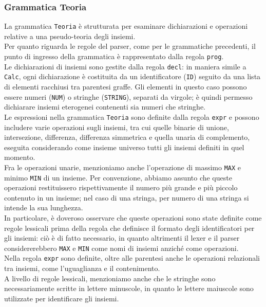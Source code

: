 \documentclass{article}
\begin{document}
\subsubsection{Grammatica Teoria}
La grammatica \texttt{Teoria} è strutturata per esaminare  dichiarazioni e operazioni relative a una pseudo-teoria degli insiemi.
\\\noindent
Per quanto riguarda le regole del parser, come per le grammatiche precedenti, il punto di ingresso della grammatica è rappresentato dalla regola \texttt{prog}.
\\\noindent
Le dichiarazioni di insiemi sono gestite dalla regola \texttt{decl}: in maniera simile a \texttt{Calc}, ogni dichiarazione è costituita da un identificatore (\texttt{ID}) seguito da una lista di elementi racchiusi tra parentesi graffe. Gli elementi in questo caso possono essere numeri (\texttt{NUM}) o stringhe (\texttt{STRING}), separati da virgole; è quindi permesso dichiarare insiemi eterogenei contenenti sia numeri che stringhe.
\\\noindent
Le espressioni nella grammatica \texttt{Teoria} sono definite dalla regola \texttt{expr} e possono includere varie operazioni sugli insiemi, tra cui quelle binarie di unione, intersezione, differenza, 
 differenza simmetrica e quella unaria di complemento, eseguita considerando come insieme universo tutti gli insiemi definiti in quel momento. 
\\\noindent
Fra le operazioni unarie, menzioniamo anche l'operazione di massimo \texttt{MAX} e minimo \texttt{MIN} di un insieme. Per convenzione, abbiamo assunto che queste operazioni restituissero rispettivamente il numero più grande e più piccolo contenuto in un insieme; nel caso di una stringa, per numero di una stringa si intende la sua lunghezza.
\\\noindent
In particolare, è doveroso osservare che queste operazioni sono state definite come regole lessicali prima della regola che definisce il formato degli identificatori per gli insiemi: ciò è di fatto necessario, in quanto altrimenti il lexer e il parser considererebbero \texttt{MAX} e \texttt{MIN} come nomi di insiemi anziché come operazioni.
\\\noindent
Nella regola \texttt{expr} sono definite, oltre alle parentesi anche le operazioni relazionali tra insiemi, come l'uguaglianza e il contenimento.
\\\noindent
A livello di regole lessicali, menzioniamo anche che le stringhe sono necessariamente scritte in lettere minuscole, in quanto le lettere maiuscole sono utilizzate per identificare gli insiemi.
\end{document}
